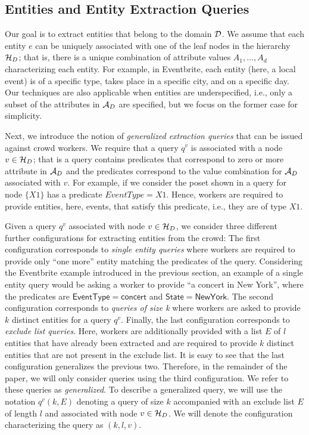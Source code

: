\subsection{Entities and Entity Extraction Queries}
\label{sec:queries}

 Our goal is to extract entities that belong to the domain $\mathcal{D}$. We assume that each entity $e$ can be uniquely associated with one of the leaf nodes in the hierarchy $\mathcal{H}_D$; that is, there is a unique combination of attribute values $A_1, \ldots, A_d$ characterizing each entity. For example, in Eventbrite, each entity (here, a local event) is of a specific type, takes place in a specific city, and on a specific day. Our techniques are also applicable when entities are underspecified, i.e., only a subset of the attributes in $\mathcal{A}_D$ are specified, but we focus on the former case for simplicity.

 Next, we introduce the notion of {\em generalized extraction queries} that can be issued against crowd workers. We require that a query $q^v$ is associated with a node $v \in \mathcal{H}_D$; that is a query contains predicates that correspond to zero or more attribute in $\mathcal{A}_D$ and the predicates correspond to the value combination for $\mathcal{A}_D$ associated with $v$. For example, if we consider the poset shown in  a query for node $\{X1\}$ has a predicate $EventType = X1$. Hence, workers are required to provide entities, here, events, that satisfy this predicate, i.e., they are of type $X1$.

Given a query $q^v$ associated with node $v \in \mathcal{H}_D$, we consider three different further configurations for  extracting entities from the crowd: The first configuration corresponds to {\em single entity queries} where workers are required to provide only ``one more'' entity matching the predicates of the query. Considering the Eventbrite example introduced in the previous section, an example of a single entity query would be asking a worker to provide ``a concert in New York'', where the predicates are $\mathsf{EventType = concert}$ and $\mathsf{State = New York}$. The second configuration corresponds to {\em queries of size k} where workers are asked to provide $k$ distinct entities for a query $q^v$. Finally, the last configuration corresponds to {\em exclude list queries}. Here,  workers are additionally provided with a list $E$ of $l$ entities that have already been extracted and are required to provide $k$ distinct entities that are not present in the exclude list. It is easy to see that the last configuration generalizes the previous two. Therefore, in the remainder of the paper, we will only consider queries using the third configuration. We refer to these queries as {\em generalized}. To describe a generalized query, we will use the notation $q^v(k,E)$ denoting a query of size $k$ accompanied with an exclude list $E$ of length $l$ and associated with node $v \in \mathcal{H}_D$. We will denote the configuration characterizing the query as $(k,l,v)$. 

